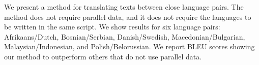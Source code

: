 We present a method for translating texts between close language pairs.  The method does not require parallel data, and it does not require the languages to be written in the same script.              We show results for six language pairs: Afrikaans/Dutch, Bosnian/Serbian, Danish/Swedish, Macedonian/Bulgarian, Malaysian/Indonesian, and Polish/Belorussian.  We report BLEU scores showing our method to outperform others that do not use parallel data.
